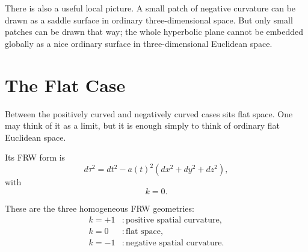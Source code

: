 \begin{classroomqa}
\end{classroomqa}

There is also a useful local picture. A small patch of negative curvature can be drawn as a saddle surface in ordinary three-dimensional space. But only small patches can be drawn that way; the whole hyperbolic plane cannot be embedded globally as a nice ordinary surface in three-dimensional Euclidean space.

\section{The Flat Case}

Between the positively curved and negatively curved cases sits flat space. One may think of it as a limit, but it is enough simply to think of ordinary flat Euclidean space.

Its FRW form is
\begin{equation}
d\tau^2=dt^2-a(t)^2\left(dx^2+dy^2+dz^2\right),
\end{equation}
with
\begin{equation}
k=0.
\end{equation}

These are the three homogeneous FRW geometries:
\begin{align}
k=+1 &: \text{positive spatial curvature},\\
k=0 &: \text{flat space},\\
k=-1 &: \text{negative spatial curvature}.
\end{align}

\begin{classroomqa}
\end{classroomqa}

